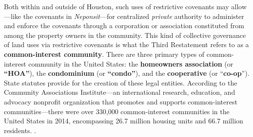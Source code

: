 

Both within and outside of Houston, such uses of restrictive covenants may
allow---like the covenants in \textit{Neponsit}---for centralized
\textit{private} authority to administer and enforce the covenants through a
corporation or association constituted from among the property owners in the
community. This kind of collective governance of land uses via restrictive
covenants is what the Third Restatement refers to as a \textbf{common-interest
community}. There are three primary types of common-interest community in the
United States: the \textbf{homeowners association} (or \textbf{``HOA''}), the
\textbf{condominium} (or \textbf{``condo''}), and the \textbf{cooperative} (or
``\textbf{co-op}''). State statutes provide for the creation of these legal
entities. According to the Community Associations Institute---an international
research, education, and advocacy nonprofit organization that promotes and
supports common-interest communities---there were over 330,000 common-interest
communities in the United States in 2014, encompassing 26.7 million housing
units and 66.7 million residents. .


